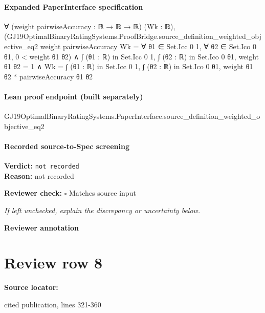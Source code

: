 \documentclass[10pt]{article}
\newcommand{\reviewerbox}{%
  \par\noindent\fbox{\parbox{0.96\linewidth}{\rule{0pt}{0.38in}}}\par
}
\newcommand{\reviewmatch}[1]{%
  \par\noindent\textbf{Reviewer check:} $\square$\; #1\par
  \noindent\emph{If left unchecked, explain the discrepancy or uncertainty below.}\par
}
\begin{document}
\paragraph{Expanded PaperInterface specification}
\begin{ReviewVerbatim}
∀ (weight pairwiseAccuracy : ℝ → ℝ → ℝ) (Wk : ℝ),
  (GJ19OptimalBinaryRatingSystems.ProofBridge.source_definition_weighted_objective_eq2 weight pairwiseAccuracy Wk =
      ∀ θ1 ∈ Set.Icc 0 1, ∀ θ2 ∈ Set.Ico 0 θ1, 0 < weight θ1 θ2) ∧
    ∫ (θ1 : ℝ) in Set.Icc 0 1, ∫ (θ2 : ℝ) in Set.Ico 0 θ1, weight θ1 θ2 = 1 ∧
      Wk = ∫ (θ1 : ℝ) in Set.Icc 0 1, ∫ (θ2 : ℝ) in Set.Ico 0 θ1, weight θ1 θ2 * pairwiseAccuracy θ1 θ2
\end{ReviewVerbatim}

\paragraph{Lean proof endpoint (built separately)}\begin{ReviewVerbatim}
GJ19OptimalBinaryRatingSystems.PaperInterface.source_definition_weighted_objective_eq2
\end{ReviewVerbatim}

\paragraph{Recorded source-to-Spec screening}
\textbf{Verdict:} \texttt{not recorded}
\\
\textbf{Reason:} not recorded
\reviewmatch{Matches source input}
\noindent\textbf{Reviewer annotation}\par
\reviewerbox
\clearpage
\hypertarget{source-claim-55d3b1e0bb545f86}{}
\section*{Review row 8}
\textbf{Source locator:} {\footnotesize\raggedright cited publication, lines 321-\allowbreak{}360\par}
\end{document}
